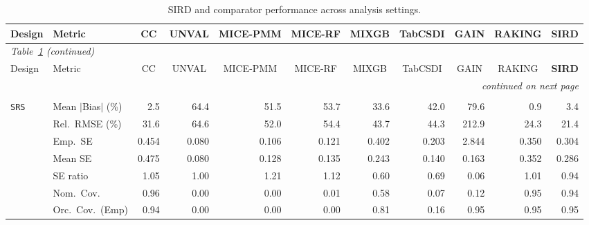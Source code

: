\begin{landscape}
\footnotesize\setlength{\tabcolsep}{3.5pt}
\begin{longtable}{llrrrrrrrrr}
\caption{SIRD and comparator performance across analysis settings.}
\label{tab:appc_nutri_Binomial} \\
\toprule
Design & Metric & \multicolumn{1}{c}{CC} & \multicolumn{1}{c}{UNVAL} & \multicolumn{1}{c}{MICE-PMM} & \multicolumn{1}{c}{MICE-RF} & \multicolumn{1}{c}{MIXGB} & \multicolumn{1}{c}{TabCSDI} & \multicolumn{1}{c}{GAIN} & \multicolumn{1}{c}{RAKING} & \multicolumn{1}{c}{\textbf{SIRD}} \\
\midrule \endfirsthead
\multicolumn{11}{l}{\footnotesize\itshape Table~\ref{tab:appc_nutri_Binomial} (continued)} \\
\toprule
Design & Metric & \multicolumn{1}{c}{CC} & \multicolumn{1}{c}{UNVAL} & \multicolumn{1}{c}{MICE-PMM} & \multicolumn{1}{c}{MICE-RF} & \multicolumn{1}{c}{MIXGB} & \multicolumn{1}{c}{TabCSDI} & \multicolumn{1}{c}{GAIN} & \multicolumn{1}{c}{RAKING} & \multicolumn{1}{c}{\textbf{SIRD}} \\
\midrule \endhead
\midrule \multicolumn{11}{r}{\footnotesize\itshape continued on next page} \\
\endfoot
\bottomrule \endlastfoot
\multicolumn{11}{l}{\textbf{Continuous Phase-Two Covariates}} \\
\addlinespace[2pt]
\quad \texttt{SRS} & Mean $|$Bias$|$ (\%) & \cellcolor{ranktwo}2.5 & 64.4 & 51.5 & 53.7 & 33.6 & 42.0 & 79.6 & \cellcolor{rankone}0.9 & \cellcolor{rankthree}3.4 \\
 & Rel.\ RMSE (\%) & \cellcolor{rankthree}31.6 & 64.6 & 52.0 & 54.4 & 43.7 & 44.3 & 212.9 & \cellcolor{ranktwo}24.3 & \cellcolor{rankone}21.4 \\
 & Emp.\ SE & 0.454 & 0.080 & 0.106 & 0.121 & 0.402 & 0.203 & 2.844 & 0.350 & 0.304 \\
 & Mean SE & 0.475 & 0.080 & 0.128 & 0.135 & 0.243 & 0.140 & 0.163 & 0.352 & 0.286 \\
 & SE ratio & \cellcolor{rankthree}1.05 & \cellcolor{rankone}1.00 & 1.21 & 1.12 & 0.60 & 0.69 & 0.06 & \cellcolor{ranktwo}1.01 & 0.94 \\
 & Nom.\ Cov. & \cellcolor{ranktwo}0.96 & 0.00 & 0.00 & 0.01 & \cellcolor{rankthree}0.58 & 0.07 & 0.12 & \cellcolor{rankone}0.95 & \cellcolor{ranktwo}0.94 \\
 & Orc.\ Cov.\ (Emp) & \cellcolor{ranktwo}0.94 & 0.00 & 0.00 & 0.00 & \cellcolor{rankthree}0.81 & 0.16 & \cellcolor{rankone}0.95 & \cellcolor{rankone}0.95 & \cellcolor{rankone}0.95 \\

\end{longtable}
\end{landscape}
